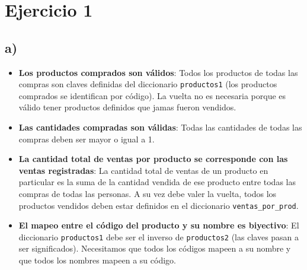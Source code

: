 \section*{Ejercicio 1}

\subsection*{a)}

\begin{itemize}
    \item \textbf{Los productos comprados son válidos}: Todos los productos de todas las compras son claves definidas del diccionario \lstinline{productos1} (los productos comprados se identifican por código). La vuelta no es necesaria porque es válido tener productos definidos que jamas fueron vendidos.
    \item \textbf{Las cantidades compradas son válidas}: Todas las cantidades de todas las compras deben ser mayor o igual a 1.
    \item \textbf{La cantidad total de ventas por producto se corresponde con las ventas registradas}: La cantidad total de ventas de un producto en particular es la suma de la cantidad vendida de ese producto entre todas las compras de todas las personas. A su vez debe valer la vuelta, todos los productos vendidos deben estar definidos en el diccionario \lstinline{ventas_por_prod}.
    \item \textbf{El mapeo entre el código del producto y su nombre es biyectivo}: El diccionario \lstinline{productos1} debe ser el inverso de \lstinline{productos2} (las claves pasan a ser significados). Necesitamos que todos los códigos mapeen a su nombre y que todos los nombres mapeen a su código.
\end{itemize}

